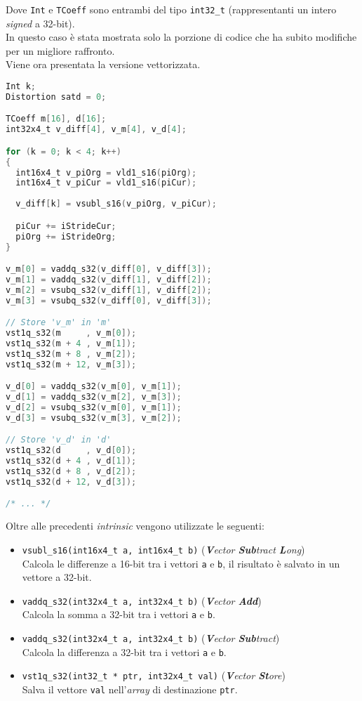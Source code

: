 Dove \verb|Int| e \verb|TCoeff| sono entrambi del tipo \verb|int32_t| 
(rappresentanti un intero \emph{signed} a 32-bit).\\

In questo caso è stata mostrata solo la porzione di codice che ha subito 
modifiche per un migliore raffronto.\\

Viene ora presentata la versione vettorizzata.

\begin{lstlisting}[language=C]
Int k;
Distortion satd = 0;

TCoeff m[16], d[16];
int32x4_t v_diff[4], v_m[4], v_d[4];

for (k = 0; k < 4; k++)
{
  int16x4_t v_piOrg = vld1_s16(piOrg);
  int16x4_t v_piCur = vld1_s16(piCur);
  
  v_diff[k] = vsubl_s16(v_piOrg, v_piCur);

  piCur += iStrideCur;
  piOrg += iStrideOrg;
}

v_m[0] = vaddq_s32(v_diff[0], v_diff[3]);
v_m[1] = vaddq_s32(v_diff[1], v_diff[2]);
v_m[2] = vsubq_s32(v_diff[1], v_diff[2]);
v_m[3] = vsubq_s32(v_diff[0], v_diff[3]);

// Store 'v_m' in 'm'
vst1q_s32(m     , v_m[0]);
vst1q_s32(m + 4 , v_m[1]);
vst1q_s32(m + 8 , v_m[2]);
vst1q_s32(m + 12, v_m[3]);

v_d[0] = vaddq_s32(v_m[0], v_m[1]);
v_d[1] = vaddq_s32(v_m[2], v_m[3]);
v_d[2] = vsubq_s32(v_m[0], v_m[1]);
v_d[3] = vsubq_s32(v_m[3], v_m[2]);

// Store 'v_d' in 'd'
vst1q_s32(d     , v_d[0]);
vst1q_s32(d + 4 , v_d[1]);
vst1q_s32(d + 8 , v_d[2]);
vst1q_s32(d + 12, v_d[3]);

/* ... */
\end{lstlisting}

Oltre alle precedenti \emph{intrinsic} vengono utilizzate le seguenti:

\begin{itemize}
  \item \verb|vsubl_s16(int16x4_t a, int16x4_t b)| (\emph{\textbf{V}ector 
    \textbf{Sub}tract \textbf{L}ong})\\
      Calcola le differenze a 16-bit tra i vettori \verb|a| e \verb|b|, il 
      risultato è salvato in un vettore a 32-bit.
  \item \verb|vaddq_s32(int32x4_t a, int32x4_t b)| (\emph{\textbf{V}ector 
    \textbf{Add}})\\
      Calcola la somma a 32-bit tra i vettori \verb|a| e \verb|b|.
  \item \verb|vaddq_s32(int32x4_t a, int32x4_t b)| (\emph{\textbf{V}ector 
    \textbf{Sub}tract})\\
      Calcola la differenza a 32-bit tra i vettori \verb|a| e \verb|b|.
  \item \verb|vst1q_s32(int32_t * ptr, int32x4_t val)| (\emph{\textbf{V}ector 
    \textbf{St}ore})\\
      Salva il vettore \verb|val| nell'\emph{array} di destinazione \verb|ptr|.
\end{itemize}

